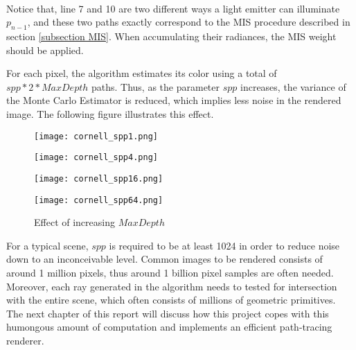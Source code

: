 ~

Notice that, line 7 and 10 are two different ways a light emitter can illuminate $p_{n-1}$, and these two paths exactly correspond to the MIS procedure described in section \ref{subsection MIS}. When accumulating their radiances, the MIS weight should be applied.


For each pixel, the algorithm estimates its color using a total of $spp*2*MaxDepth$ paths. Thus, as the parameter $spp$ increases, the variance of the Monte Carlo Estimator is reduced, which implies less noise in the rendered image. The following figure illustrates this effect.


\begin{figure}[H]
    \centering
    
    \begin{minipage}[t]{.45\textwidth}
        \centering
        \vspace{0pt}
        \texttt{[image: cornell\_spp1.png]}
    \end{minipage}
    \begin{minipage}[t]{.45\textwidth}
        \centering
        \vspace{0pt}
        \texttt{[image: cornell\_spp4.png]}
    \end{minipage}

    \vspace{0.3cm}

    \begin{minipage}[t]{.45\textwidth}
        \centering
        \vspace{0pt}
        \texttt{[image: cornell\_spp16.png]}
    \end{minipage}
    \begin{minipage}[t]{.45\textwidth}
        \centering
        \vspace{0pt}
        \texttt{[image: cornell\_spp64.png]}
    \end{minipage}
    \caption{Effect of increasing $MaxDepth$}
    \label{fig maxdepth}
\end{figure}

For a typical scene, $spp$ is required to be at least 1024 in order to reduce noise down to an inconceivable level. Common images to be rendered consists of around 1 million pixels, thus around 1 billion pixel samples are often needed. Moreover, each ray generated in the algorithm needs to tested for intersection with the entire scene, which often consists of millions of geometric primitives. The next chapter of this report will discuss how this project copes with this humongous amount of computation and implements an efficient path-tracing renderer.

